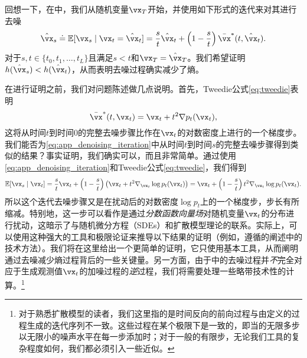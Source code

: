 \documentclass[../../book-main.tex]{subfiles}
\begin{document}
回想一下，在中，我们从随机变量\(\vx_{T}\)开始，并使用如下形式的迭代来对其进行去噪
\begin{equation}\label{eq:app_denoising_iteration}
    \hat{\vx}_{s} \doteq \Ex[\vx_{s} \mid \vx_{t} = \hat{\vx}_{t}] = \frac{s}{t}\hat{\vx}_{t} + \bp{1 - \frac{s}{t}}\bar{\vx}^{\ast}(t, \hat{\vx}_{t}).
\end{equation}
对于\(s, t \in \{t_{0}, t_{1}, \dots, t_{L}\}\)且满足\(s < t\)和\(\vx_{T} = \hat{\vx}_{T}\)。我们希望证明\(h(\hat{\vx}_{s}) < h(\hat{\vx}_{t})\)，从而表明去噪过程确实减少了熵。

在进行证明之前，我们对问题陈述做几点说明。首先，Tweedie公式\eqref{eq:tweedie}表明
\begin{equation}
    \bar{\vx}^{\ast}(t, \vx_{t}) = \vx_{t} + t^{2}\nabla p_{t}(\vx_{t}),
\end{equation}
这将从时间\(t\)到时间\(0\)的完整去噪步骤比作在\(\vx_{t}\)的对数密度上进行的一个梯度步。我们能否为\eqref{eq:app_denoising_iteration}中从时间\(t\)到时间\(s\)的完整去噪步骤得到类似的结果？事实证明，我们确实可以，而且非常简单。通过使用\eqref{eq:app_denoising_iteration}和Tweedie公式\eqref{eq:tweedie}，我们得到
\begin{equation}\label{eq:app_denoising_iteration_score}
    \Ex[\vx_{s} \mid \vx_{t}] = \frac{s}{t}\vx_{t} + \bp{1 - \frac{s}{t}}\bp{\vx_{t} + t^{2}\nabla_{\vx_{t}}\log p_{t}(\vx_{t})} = \vx_{t} + \bp{1 - \frac{s}{t}}t^{2}\nabla_{\vx_{t}}\log p_{t}(\vx_{t}).
\end{equation}
所以这个迭代去噪步骤又是在扰动后的对数密度\(\log p_{t}\)上的一个梯度步，步长有所缩减。特别地，这一步可以看作是通过\textit{分数函数向量场}对随机变量\(\vx_{t}\)的分布进行扰动，这暗示了与随机微分方程（SDEs）和扩散模型理论\cite{song2020score}的联系。实际上，可以使用这种强大的工具和极限论证来推导以下结果的证明（例如，遵循\cite{DBLP:conf/iclr/ChenC0LSZ23}的阐述中的技术方法）。我们将在这里给出一个更简单的证明，它只使用基本工具，从而阐明通过去噪减少熵过程背后的一些关键量。另一方面，由于中的去噪过程并\textit{不}完全对应于生成观测值\(\vx_{t}\)的加噪过程的\textit{逆}过程，我们将需要处理一些略带技术性的计算。\footnote{对于熟悉扩散模型的读者，我们这里指的是时间反向的前向过程与由定义的过程生成的迭代序列不一致。这些过程在某个极限下是一致的，即当的无限多步以无限小的噪声水平在每一步添加时；对于一般的有限步，无论我们工具的复杂程度如何，我们都必须引入一些近似。}
\end{document}
